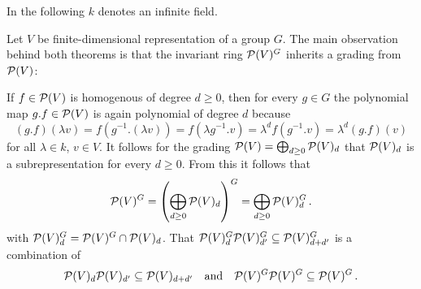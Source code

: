 

\begin{conventions}
  In the following $k$ denotes an infinite field.
\end{conventions}


\begin{fluff}
  Let $V$ be finite-dimensional representation of a group $G$.
  The main observation behind both theorems is that the invariant ring $\mathcal{P}(V)^G$ inherits a grading from $\mathcal{P}(V)$:
  
  If $f \in \mathcal{P}(V)$ is homogenous of degree $d \geq 0$, then for every $g \in G$ the polynomial map $g.f \in \mathcal{P}(V)$ is again polynomial of degree $d$ because
  \[
      (g.f)(\lambda v)
    = f(g^{-1}.(\lambda v))
    = f(\lambda g^{-1}.v)
    = \lambda^d f(g^{-1}.v)
    = \lambda^d (g.f)(v)
  \]
  for all $\lambda \in k$, $v \in V$.
  It follows for the grading $\mathcal{P}(V) = \bigoplus_{d \geq 0} \mathcal{P}(V)_d$ that $\mathcal{P}(V)_d$ is a subrepresentation for every $d \geq 0$.
  From this it follows that
  \[
      \mathcal{P}(V)^G
    = \left( \bigoplus_{d \geq 0} \mathcal{P}(V)_d \right)^G
    = \bigoplus_{d \geq 0} \mathcal{P}(V)^G_d \,.
  \]
  with $\mathcal{P}(V)^G_d = \mathcal{P}(V)^G \cap \mathcal{P}(V)_d$.
  That $\mathcal{P}(V)^G_d \mathcal{P}(V)^G_{d'} \subseteq \mathcal{P}(V)^G_{d+d'}$ is a combination of
  \[
    \mathcal{P}(V)_d \mathcal{P}(V)_{d'} \subseteq \mathcal{P}(V)_{d+d'}
    \quad\text{and}\quad
    \mathcal{P}(V)^G \mathcal{P}(V)^G \subseteq \mathcal{P}(V)^G \,.
  \]
\end{fluff}











